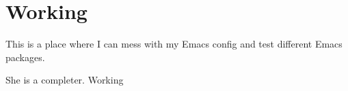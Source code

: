 \documentclass[12pt]{article}
\begin{document}
\section*{Working}

This is a place where I can mess with my Emacs config and test different Emacs packages.

She is a completer. 
Working 
\end{document}
